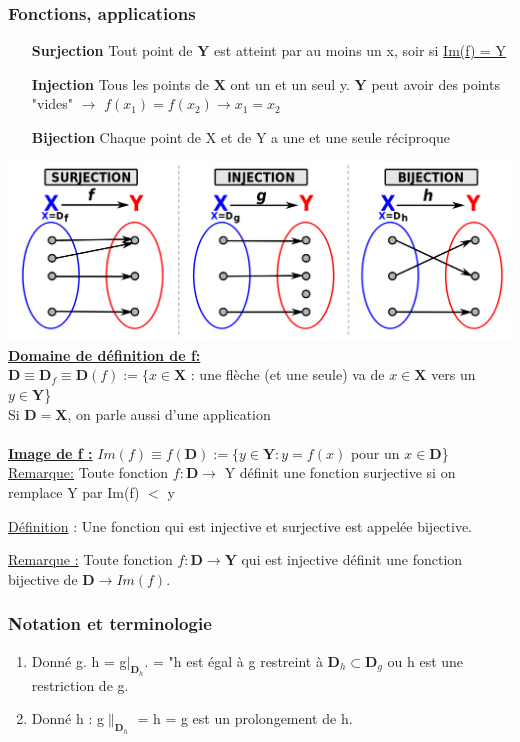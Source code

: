 \documentclass[12pt,a4paper]{article}
\newcommand{\evid}[1]{\textbf{\underline{#1}}}
\newcommand{\Definition}{\underline{Définition} }
\begin{document}
\subsubsection{Fonctions, applications}
\begin{itemize}
\item[\textbf{Surjection}] Tout point de $\mathbf{Y}$ est atteint par au moins un x, soir si \underline{Im(f) = Y}
\item[\textbf{Injection}] Tous les points de $\mathbf{X}$ ont un et un seul y. $\mathbf{Y}$ peut avoir des points "vides" $\to$ \underline{$f(x_1) = f(x_2) \to x_1 = x_2$}
\item[\textbf{Bijection}] Chaque point de X et de Y a une et une seule réciproque
\end{itemize}
\includegraphics[scale=0.35]{illustrations_Analyse/fonctions}\\
\evid{Domaine de définition de f:}\\
$\mathbf{D} \equiv \mathbf{D}_f \equiv \mathbf{D}(f) := \{x \in \mathbf{X}$ : une flèche (et une seule) va de $x \in \mathbf{X}$ vers un $y \in \mathbf{Y}$\}\\
Si $\mathbf{D} = \mathbf{X}$, on parle aussi d'une application\\
\\
\evid{Image de f :} $Im(f) \equiv f(\mathbf{D}) := \{y \in \mathbf{Y} : y = f(x)$ pour un $x \in \mathbf{D}$\}\\
\underline{Remarque:} Toute fonction $f: \mathbf{D} \to $ Y définit une fonction surjective si on remplace Y par Im(f) $<$ y
\begin{boite}\Definition : Une fonction qui est injective et surjective est appelée bijective.
\end{boite}
\underline{Remarque :} Toute fonction $f : \mathbf{D} \to \mathbf{Y}$ qui est injective définit une fonction bijective de $\mathbf{D} \to Im(f)$.

\subsubsection{Notation et terminologie}
\begin{enumerate}%
\item Donné g. h = g$|_{\mathbf{D}_h}$. = "h est égal à g restreint à $\mathbf{D}_h \subset \mathbf{D}_g$ ou h est une restriction de g.
\item Donné h : g$\|_{\mathbf{D}_h}$ = h = g est un prolongement de h.
\end{enumerate}
\end{document}
